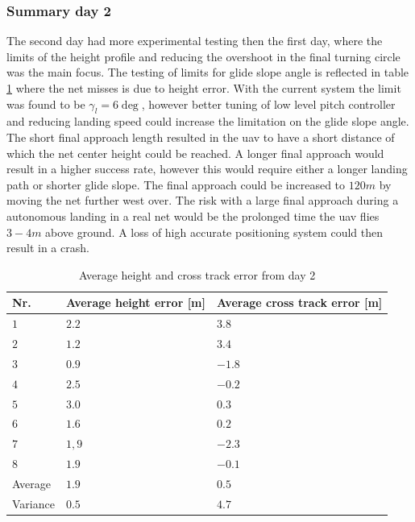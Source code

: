 \subsubsection{Summary day 2}
The second day had more experimental testing then the first day, where the limits of the height profile and reducing the overshoot in the final turning circle was the main focus. The testing of limits for glide slope angle is reflected in table \ref{Tb:AverageCrossHeightDay2} where the net misses is due to height error. With the current system the limit was found to be $\gamma_l=6\deg$, however better tuning of low level pitch controller and reducing landing speed could increase the limitation on the glide slope angle. The short final approach length resulted in the \gls{uav} to have a short distance of which the net center height could be reached. A longer final approach would result in a higher success rate, however this would require either a longer landing path or shorter glide slope. The final approach could be increased to $120 m$ by moving the net further west over. The risk with a large final approach during a autonomous landing in a real net would be the prolonged time the \gls{uav} flies $3-4 m$ above ground. A loss of high accurate positioning system could then result in a crash.
\begin{table}[H]
\centering
\begin{tabular}{| l | l | l |}
\hline
\textbf{Nr.} 	& \textbf{Average height error [m]} 	& \textbf{Average cross track error [m]}  \\ \hline
$1$				& $2.2$							& $3.8$										\\ \hline
$2$				& $1.2$							& $3.4$										\\ \hline
$3$				& $0.9$							& $-1.8$									\\ \hline
$4$				& $2.5$							& $-0.2$									\\ \hline
$5$				& $3.0$							& $0.3$										\\ \hline
$6$				& $1.6$							& $0.2$										\\ \hline
$7$				& $1,9$							& $-2.3$									\\ \hline
$8$				& $1.9$							& $-0.1$									\\ \hline
Average			& $1.9$							& $0.5$										\\ \hline
Variance		& $0.5$							& $4.7$										\\ \hline
\end{tabular}
\caption{Average height and cross track error from day 2}
\label{Tb:AverageCrossHeightDay2}
\end{table}

